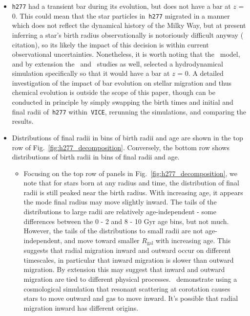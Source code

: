 \documentclass[fleqn, usenatbib]{mnras}
\begin{document}
\begin{itemize}
	\item \texttt{h277} had a transient bar during its evolution, but does 
	not have a bar at $z$ = 0. This could mean that the star particles 
	in~\texttt{h277} migrated in a manner which does not reflect the dynamical 
	history of the Milky Way, but at present inferring a star's birth radius 
	observationally is notoriously difficult anyway ({\color{red} citation}), 
	so its likely the impact of this decision is within current 
	observational uncertainties. Nonetheless, it is worth noting that 
	the~\citet{Minchev2013} model, and by extension the~\citet{Minchev2014} 
	and~\citet{Minchev2017} studies as well, selected a hydrodynamical 
	simulation specifically so that it would have a bar at $z$ = 0. A detailed 
	investigation of the impact of bar evolution on stellar migration and thus 
	chemical evolution is outside the scope of this paper, though can be 
	conducted in principle by simply swapping the birth times and initial and 
	final radii of~\texttt{h277} within~\texttt{VICE}, rerunning the 
	simulations, and comparing the results. 

	\item Distributions of final radii in bins of birth radii and age are 
	shown in the top row of Fig.~\ref{fig:h277_decomposition}. Conversely, the 
	bottom row shows distributions of birth radii in bins of final radii and 
	age. 
	\begin{itemize} 
		\item Focusing on the top row of panels in 
		Fig.~\ref{fig:h277_decomposition}, we note that for stars born at any 
		radius and time, the distribution of final radii is still peaked near 
		the birth radius. With increasing age, it appears the mode final radius 
		may move slightly inward. The tails of the distributions to large radii 
		are relatively age-independent - some differences between the 0 - 2 and 
		8 - 10 Gyr age bins, but not much. However, the tails of the 
		distributions to small radii are not age-independent, and move toward 
		smaller $R_\text{gal}$ with increasing age. This suggests that radial 
		migration inward and outward occur on different timescales, in 
		particular that inward migration is slower than 
		outward migration. By extension this may suggest that inward and 
		outward migration are tied to different physical 
		processes.~\citet{Roskar2008a} demonstrate using a cosmological 
		simulation that resonant scattering at corotation causes stars to 
		move outward and gas to move inward. It's possible that radial 
		migration inward has different origins. 


\end{itemize}
\end{itemize}
\end{document}
